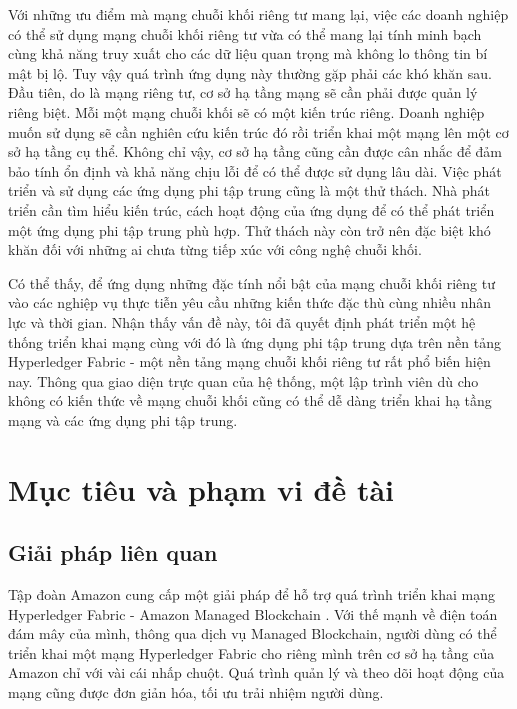 \documentclass[../DoAn.tex]{subfiles}
\begin{document}
Với những ưu điểm mà mạng chuỗi khối riêng tư mang lại, việc các doanh nghiệp có thể sử dụng mạng chuỗi khối riêng tư vừa có thể mang lại tính minh bạch cùng khả năng truy xuất cho các dữ liệu quan trọng mà không lo thông tin bí mật bị lộ. Tuy vậy quá trình ứng dụng này thường gặp phải các khó khăn sau. Đầu tiên, do là mạng riêng tư, cơ sở hạ tầng mạng sẽ cần phải được quản lý riêng biệt. Mỗi một mạng chuỗi khối sẽ có một kiến trúc riêng. Doanh nghiệp muốn sử dụng sẽ cần nghiên cứu kiến trúc đó rồi triển khai một mạng lên một cơ sở hạ tầng cụ thể. Không chỉ vậy, cơ sở hạ tầng cũng cần được cân nhắc để đảm bảo tính ổn định và khả năng chịu lỗi để có thể được sử dụng lâu dài. Việc phát triển và sử dụng các ứng dụng phi tập trung cũng là một thử thách. Nhà phát triển cần tìm hiểu kiến trúc, cách hoạt động của ứng dụng để có thể phát triển một ứng dụng phi tập trung phù hợp. Thử thách này còn trở nên đặc biệt khó khăn đối với những ai chưa từng tiếp xúc với công nghệ chuỗi khối.

Có thể thấy, để ứng dụng những đặc tính nổi bật của mạng chuỗi khối riêng tư vào các nghiệp vụ thực tiễn yêu cầu những kiến thức đặc thù cùng nhiều nhân lực và thời gian. Nhận thấy vấn đề này, tôi đã quyết định phát triển một hệ thống triển khai mạng cùng với đó là ứng dụng phi tập trung dựa trên nền tảng Hyperledger Fabric \cite{fabric} - một nền tảng mạng chuỗi khối riêng tư rất phổ biến hiện nay. Thông qua giao diện trực quan của hệ thống, một lập trình viên dù cho không có kiến thức về mạng chuỗi khối cũng có thể dễ dàng triển khai hạ tầng mạng và các ứng dụng phi tập trung.

\section{Mục tiêu và phạm vi đề tài}
\label{section:1.2}

\subsection{Giải pháp liên quan}
Tập đoàn Amazon cung cấp một giải pháp để hỗ trợ quá trình triển khai mạng Hyperledger Fabric - Amazon Managed Blockchain \cite{amazon}. Với thế mạnh về điện toán đám mây của mình, thông qua dịch vụ Managed Blockchain, người dùng có thể triển khai một mạng Hyperledger Fabric cho riêng mình trên cơ sở hạ tầng của Amazon chỉ với vài cái nhấp chuột. Quá trình quản lý và theo dõi hoạt động của mạng cũng được đơn giản hóa, tối ưu trải nhiệm người dùng. 
\end{document}
